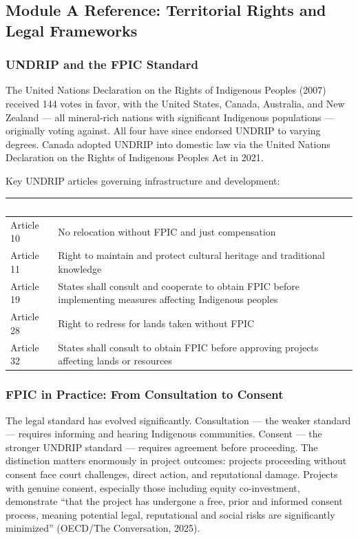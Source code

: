 \documentclass[11pt,letterpaper]{article}
\newcommand{\tableheader}[1]{\textbf{\sffamily\textcolor{white}{#1}}}
\begin{document}
\subsection{Module A Reference: Territorial Rights and Legal Frameworks}

\subsubsection{UNDRIP and the FPIC Standard}

The United Nations Declaration on the Rights of Indigenous Peoples (2007) received 144 votes in favor, with the United States, Canada, Australia, and New Zealand --- all mineral-rich nations with significant Indigenous populations --- originally voting against. All four have since endorsed UNDRIP to varying degrees. Canada adopted UNDRIP into domestic law via the United Nations Declaration on the Rights of Indigenous Peoples Act in 2021.

Key UNDRIP articles governing infrastructure and development:

\begin{center}
\begin{tabularx}{\textwidth}{C{2cm}X}
\toprule
{}
\tableheader{Article} & \tableheader{Provision} \\
\midrule
Article 10 & No relocation without FPIC and just compensation \\
Article 11 & Right to maintain and protect cultural heritage and traditional knowledge \\
Article 19 & States shall consult and cooperate to obtain FPIC before implementing measures affecting Indigenous peoples \\
Article 28 & Right to redress for lands taken without FPIC \\
Article 32 & States shall consult to obtain FPIC before approving projects affecting lands or resources \\
\bottomrule
\end{tabularx}
\end{center}

\subsubsection{FPIC in Practice: From Consultation to Consent}

The legal standard has evolved significantly. Consultation --- the weaker standard --- requires informing and hearing Indigenous communities. Consent --- the stronger UNDRIP standard --- requires agreement before proceeding. The distinction matters enormously in project outcomes: projects proceeding without consent face court challenges, direct action, and reputational damage. Projects with genuine consent, especially those including equity co-investment, demonstrate ``that the project has undergone a free, prior and informed consent process, meaning potential legal, reputational and social risks are significantly minimized'' (OECD/The Conversation, 2025).
\end{document}
